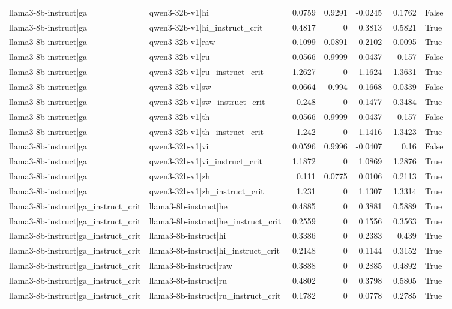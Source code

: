 \begin{table}
\begin{tabular}{l l r r r r l}
llama3-8b-instruct|ga & qwen3-32b-v1|hi & 0.0759 & 0.9291 & -0.0245 & 0.1762 & False \\
llama3-8b-instruct|ga & qwen3-32b-v1|hi_instruct_crit & 0.4817 & 0 & 0.3813 & 0.5821 & True \\
llama3-8b-instruct|ga & qwen3-32b-v1|raw & -0.1099 & 0.0891 & -0.2102 & -0.0095 & True \\
llama3-8b-instruct|ga & qwen3-32b-v1|ru & 0.0566 & 0.9999 & -0.0437 & 0.157 & False \\
llama3-8b-instruct|ga & qwen3-32b-v1|ru_instruct_crit & 1.2627 & 0 & 1.1624 & 1.3631 & True \\
llama3-8b-instruct|ga & qwen3-32b-v1|sw & -0.0664 & 0.994 & -0.1668 & 0.0339 & False \\
llama3-8b-instruct|ga & qwen3-32b-v1|sw_instruct_crit & 0.248 & 0 & 0.1477 & 0.3484 & True \\
llama3-8b-instruct|ga & qwen3-32b-v1|th & 0.0566 & 0.9999 & -0.0437 & 0.157 & False \\
llama3-8b-instruct|ga & qwen3-32b-v1|th_instruct_crit & 1.242 & 0 & 1.1416 & 1.3423 & True \\
llama3-8b-instruct|ga & qwen3-32b-v1|vi & 0.0596 & 0.9996 & -0.0407 & 0.16 & False \\
llama3-8b-instruct|ga & qwen3-32b-v1|vi_instruct_crit & 1.1872 & 0 & 1.0869 & 1.2876 & True \\
llama3-8b-instruct|ga & qwen3-32b-v1|zh & 0.111 & 0.0775 & 0.0106 & 0.2113 & True \\
llama3-8b-instruct|ga & qwen3-32b-v1|zh_instruct_crit & 1.231 & 0 & 1.1307 & 1.3314 & True \\
llama3-8b-instruct|ga_instruct_crit & llama3-8b-instruct|he & 0.4885 & 0 & 0.3881 & 0.5889 & True \\
llama3-8b-instruct|ga_instruct_crit & llama3-8b-instruct|he_instruct_crit & 0.2559 & 0 & 0.1556 & 0.3563 & True \\
llama3-8b-instruct|ga_instruct_crit & llama3-8b-instruct|hi & 0.3386 & 0 & 0.2383 & 0.439 & True \\
llama3-8b-instruct|ga_instruct_crit & llama3-8b-instruct|hi_instruct_crit & 0.2148 & 0 & 0.1144 & 0.3152 & True \\
llama3-8b-instruct|ga_instruct_crit & llama3-8b-instruct|raw & 0.3888 & 0 & 0.2885 & 0.4892 & True \\
llama3-8b-instruct|ga_instruct_crit & llama3-8b-instruct|ru & 0.4802 & 0 & 0.3798 & 0.5805 & True \\
llama3-8b-instruct|ga_instruct_crit & llama3-8b-instruct|ru_instruct_crit & 0.1782 & 0 & 0.0778 & 0.2785 & True \\

\end{tabular}
\end{table}
